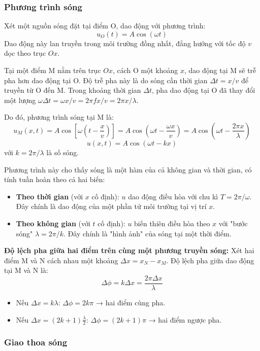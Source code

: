 \subsubsection{Phương trình sóng}

Xét một nguồn sóng đặt tại điểm O, dao động với phương trình:
\[
    u_O(t) = A\cos(\omega t)
\]
Dao động này lan truyền trong môi trường đồng nhất, đẳng hướng với tốc độ $v$ dọc theo trục $Ox$.

Tại một điểm M nằm trên trục $Ox$, cách O một khoảng $x$, dao động tại M sẽ trễ pha hơn dao động tại O. Độ trễ pha này là do sóng cần thời gian $\Delta t = x/v$ để truyền từ O đến M. Trong khoảng thời gian $\Delta t$, pha dao động tại O đã thay đổi một lượng $\omega\Delta t = \omega x/v = 2\pi f x/v = 2\pi x/\lambda$.

Do đó, phương trình sóng tại M là:
\[
    u_M(x, t) = A\cos\left[\omega\left(t - \frac{x}{v}\right)\right] = A\cos\left(\omega t - \frac{\omega x}{v}\right) = A\cos\left(\omega t - \frac{2\pi x}{\lambda}\right)
\]
\[
    \boxed{u(x, t) = A\cos(\omega t - kx)}
\]
với $k = 2\pi/\lambda$ là số sóng.

Phương trình này cho thấy sóng là một hàm của cả không gian và thời gian, có tính tuần hoàn theo cả hai biến:
\begin{itemize}
    \item \textbf{Theo thời gian} (với $x$ cố định): $u$ dao động điều hòa với chu kì $T = 2\pi/\omega$. Đây chính là dao động của một phần tử môi trường tại vị trí $x$.
    \item \textbf{Theo không gian} (với $t$ cố định): $u$ biến thiên điều hòa theo $x$ với "bước sóng" $\lambda = 2\pi/k$. Đây chính là "hình ảnh" của sóng tại một thời điểm.
\end{itemize}

\textbf{Độ lệch pha giữa hai điểm trên cùng một phương truyền sóng:}
Xét hai điểm M và N cách nhau một khoảng $\Delta x = x_N - x_M$. Độ lệch pha giữa dao động tại M và N là:
\[
    \Delta\phi = k\Delta x = \dfrac{2\pi\Delta x}{\lambda}
\]
\begin{itemize}
    \item Nếu $\Delta x = k\lambda$: $\Delta\phi = 2k\pi$ → hai điểm cùng pha.
    \item Nếu $\Delta x = (2k+1)\frac{\lambda}{2}$: $\Delta\phi = (2k+1)\pi$ → hai điểm ngược pha.
\end{itemize}

\subsubsection{Giao thoa sóng}

